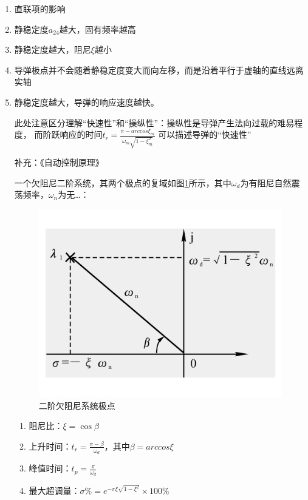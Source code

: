 \begin{enumerate}[1)]
    \item 直联项的影响
    \item 静稳定度$a_{24}$越大，固有频率越高
    \item 静稳定度越大，阻尼$\xi$越小
    \item 导弹极点并不会随着静稳定度变大而向左移，而是沿着平行于虚轴的直线远离实轴
    \item 静稳定度越大，导弹的响应速度越快。
    
    {\kaishu 此处注意区分理解“快速性”和“操纵性”：操纵性是导弹产生法向过载的难易程度，
    而阶跃响应的时间$t_r = \frac{\pi - arccos\xi_{\dot{m}}}{\omega_{m}\sqrt{1-\xi_{m}^2}}$
    可以描述导弹的“快速性”
    
    补充：《自动控制原理》
    
    一个欠阻尼二阶系统，其两个极点的复域如图\ref{exrem_point}所示，其中$\omega_d$为有阻尼自然震荡频率，$\omega_n$为无\dots：
    \begin{figure}[H]
        \centering
        \includegraphics[scale = 0.35]{pictures/chapter8/2_order}
        \caption{二阶欠阻尼系统极点}
        \label{exrem_point}
    \end{figure}
    \begin{enumerate}[i]
        \item 阻尼比：$\xi = \cos\beta$ 
        \item 上升时间：$t_r = \frac{\pi-\beta}{\omega_d}$，其中$\beta = arccos\xi$
        \item 峰值时间：$t_p = \frac{\pi}{\omega_d}$
        \item 最大超调量：$\sigma\% = e^{-\pi\xi\sqrt{1-\xi^2}}\times100\%$

\end{enumerate}}
\end{enumerate}
